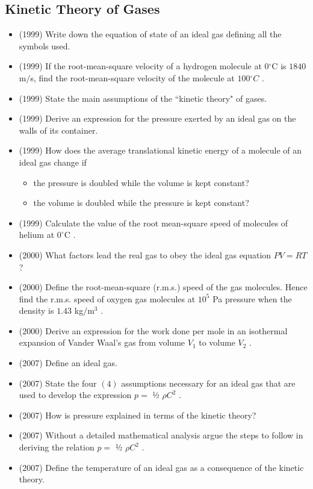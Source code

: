 \documentclass{article}
\begin{document}
\subsection{Kinetic Theory of Gases}
\begin{itemize}
\item (1999)  Write down the equation of state of an ideal gas defining all the symbols used.
\item (1999)  If the root-mean-square velocity of a hydrogen molecule at $ 0​ ^{\circ}$C is $ 1840$ m$/$s, find the root-mean-square velocity of the molecule at $ 100​ ^{\circ}$ ​ $ C$ .
\item (1999)  State the main assumptions of the “kinetic theory" of gases.
\item (1999)  Derive an expression for the pressure exerted by an ideal gas on the walls of its container.
\item (1999)  How does the average translational kinetic energy of a molecule of an ideal gas change if\begin{itemize}
\item the pressure is doubled while the volume is kept constant?
\item the volume is doubled while the pressure is kept constant?
\end{itemize}
\item (1999)  Calculate the value of the root mean-square speed of molecules of helium at $ 0^{\circ}$C .
\item (2000)  What factors lead the real gas to obey the ideal gas equation $ PV = RT$ ?
\item (2000)  Define the root-mean-square (r.m.s.) speed of the gas molecules. Hence find the r.m.s. speed of oxygen gas molecules at $ 10^{5}$ Pa pressure when the density is $ 1.43$ kg$/$m$ ^{3}$ .
\item (2000)  Derive an expression for the work done per mole in an isothermal expansion of Vander Waal’s gas from volume $ V_{1}$ to volume $ V_{2}$ .
\item (2007)  Define an ideal gas.
\item (2007)  State the four $ (4)$ assumptions necessary for an ideal gas that are used to develop the expression $ p=$ ½ $ \rho C^{2}$ .
\item (2007)  How is pressure explained in terms of the kinetic theory? 
\item (2007)  Without a detailed mathematical analysis argue the steps to follow in deriving the relation $ p=$ ½ $ \rho C^{2}$ .
\item (2007)  Define the temperature of an ideal gas as a consequence of the kinetic theory.

\end{itemize}
\end{document}
